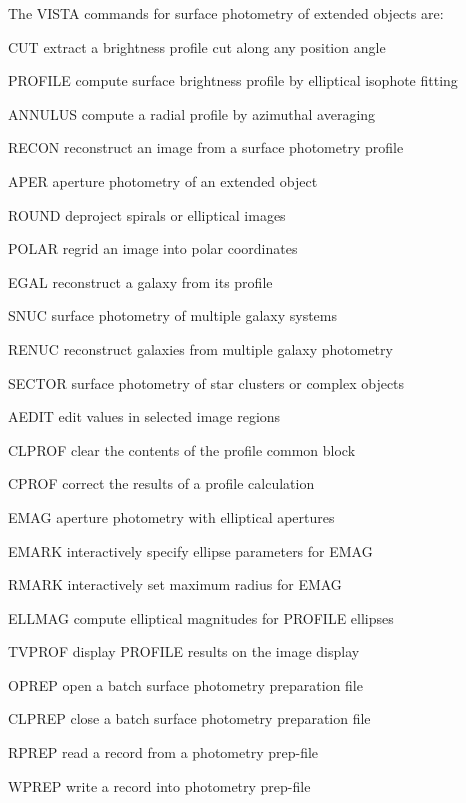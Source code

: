 The VISTA commands for surface photometry of extended objects are:
\begin{example}
  \item[CUT\hfill]{extract a brightness profile cut along any position angle}
  \item[PROFILE\hfill]{compute surface brightness profile by elliptical
       isophote fitting}
  \item[ANNULUS\hfill]{compute a radial profile by azimuthal averaging}
  \item[RECON\hfill]{reconstruct an image from a surface photometry profile}
  \item[APER\hfill]{aperture photometry of an extended object}
  \item[ROUND\hfill]{deproject spirals or elliptical images}
  \item[POLAR\hfill]{regrid an image into polar coordinates}
  \item[EGAL\hfill]{reconstruct a galaxy from its profile}
  \item[SNUC\hfill]{surface photometry of multiple galaxy systems}
  \item[RENUC\hfill]{reconstruct galaxies from multiple galaxy photometry}
  \item[SECTOR\hfill]{surface photometry of star clusters or complex
       objects} 
  \item[AEDIT\hfill]{edit values in selected image regions}
  \item[CLPROF\hfill]{clear the contents of the profile common block}
  \item[CPROF\hfill]{correct the results of a profile calculation}
  \item[EMAG\hfill]{aperture photometry with elliptical apertures}
  \item[EMARK\hfill]{interactively specify ellipse parameters for EMAG} 
  \item[RMARK\hfill]{interactively set maximum radius for EMAG}
  \item[ELLMAG\hfill]{compute elliptical magnitudes for PROFILE ellipses}
  \item[TVPROF\hfill]{display PROFILE results on the image display}
  \item[OPREP\hfill]{open a batch surface photometry preparation file}
  \item[CLPREP\hfill]{close a batch surface photometry preparation file}
  \item[RPREP\hfill]{read a record from a photometry prep-file}
  \item[WPREP\hfill]{write a record into photometry prep-file}
\end{example}

